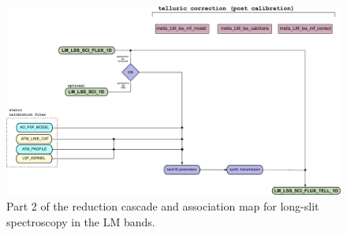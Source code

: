 \begin{landscape}
\begin{figure}[ht]
  \centering
  \includegraphics{figures/LM_LSS_pipeline_wf_draft_latest_part_2_v0.83.pdf}
  \caption[Reduction cascade and association map for LM long-slit
  spectroscopy]{Part 2 of the reduction cascade and association map for long-slit
    spectroscopy in the LM bands.}
  \label{Fig:LMLssAssomap2}
\end{figure}
\end{landscape}




